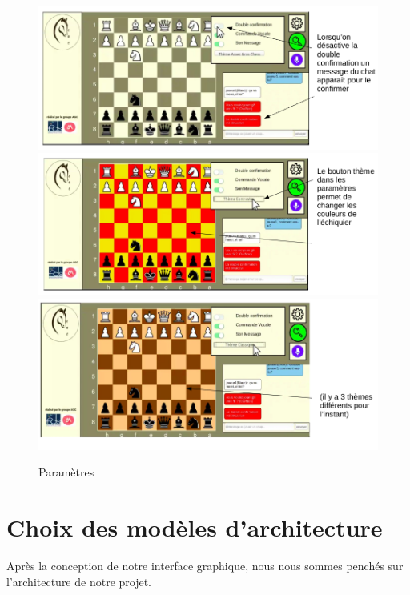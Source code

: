 \documentclass[12pt, openany]{report}
\begin{document}
\begin{center}
\begin{figure}
                   \includegraphics[width=12cm]{UseCase/Jeu1/Game11.png}
                   \includegraphics[width=12cm]{UseCase/Jeu1/Game12.png}
                   \includegraphics[width=12cm]{UseCase/Jeu1/Game13.png}
                    \caption{Paramètres}
                \end{figure}

    
\end{center}{}

\newpage
\section{Choix des modèles d'architecture} 
Après la conception de notre interface graphique, nous nous sommes penchés sur l'architecture de notre projet.
\end{document}
